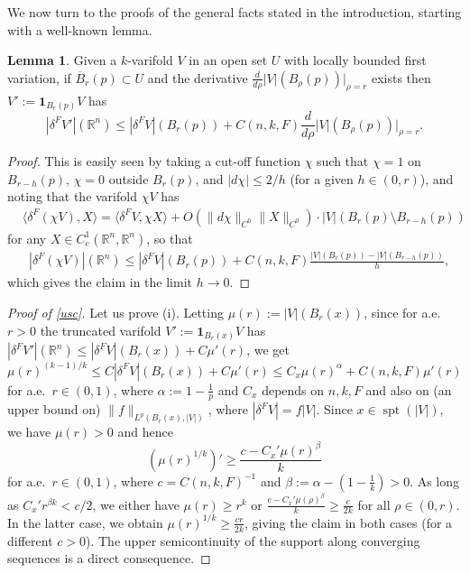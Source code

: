 \documentclass[11pt,a4paper]{amsart}
\newcommand{\R}{\mathbb{R}}
\newcommand{\ang}[1]{\langle#1\rangle}
\newcommand{\uno}{\bm{1}}
\renewcommand{\bar}{\overline}
\theoremstyle{definition}
\newtheorem{lemmaen}[definition]{Lemma}
\begin{document}
We now turn to the proofs of the general facts stated in the introduction, starting with a well-known lemma.

\begin{lemmaen}\label{trunc}
    Given a $k$-varifold $V$ in an open set $U$ with locally bounded first variation,
    if $\bar B_r(p)\subset U$ and the derivative $\frac{d}{d\rho}|V|(B_\rho(p))|_{\rho=r}$ exists then $V':=\uno_{B_r(p)}V$ has
    $$|\delta^F V'|(\R^n)\le |\delta^F V|(B_r(p))+C(n,k,F)\frac{d}{d\rho}|V|(B_\rho(p))\Big|_{\rho=r}.$$
\end{lemmaen}

\begin{proof}
    This is easily seen by taking a cut-off function $\chi$ such that $\chi=1$ on $B_{r-h}(p)$, $\chi=0$ outside $B_{r}(p)$, and $|d\chi|\le{2}/{h}$ (for a given $h\in(0,r)$), and noting that the varifold $\chi V$ has
	\begin{align*}
		&\ang{\delta^F(\chi V),X}=\ang{\delta^F V,\chi X}+O(\|d\chi\|_{C^0}\|X\|_{C^0})\cdot |V|(B_{r}(p)\setminus B_{r-h}(p))
	\end{align*}
	for any $X\in C^1_c(\R^n,\R^n)$, so that
	\begin{align*}
		&|\delta^F(\chi V)|(\R^n)\le |\delta^FV|(B_r(p))+C(n,k,F)\frac{|V|(B_{r}(p))-|V|(B_{r-h}(p))}{h},
	\end{align*}
    which gives the claim in the limit $h\to 0$.
\end{proof}

\begin{proof}[Proof of \cref{usc}]
    Let us prove (i). Letting $\mu(r):=|V|(B_r(x))$, since for a.e.\ $r>0$ the truncated varifold
$V':=\uno_{B_r(x)}V$ has $|\delta^FV'|(\R^n)\le|\delta^F V|(B_r(x))+C\mu'(r)$, we get
$$\mu(r)^{(k-1)/k}\le C|\delta^FV|(B_r(x))+C\mu'(r)\le C_x\mu(r)^\alpha+C(n,k,F)\mu'(r)$$
for a.e.\ $r\in(0,1)$, where $\alpha:=1-\frac1p$ and $C_x$ depends on $n,k,F$ and also on (an upper bound on) $\|f\|_{L^p(B_r(x),|V|)}$, where $|\delta^FV|=f|V|$.
Since $x\in\operatorname{spt}(|V|)$, we have $\mu(r)>0$ and hence
$$(\mu(r)^{1/k})'\ge \frac{c-C_x'\mu(r)^\beta}{k}$$
for a.e.\ $r\in(0,1)$,
where $c=C(n,k,F)^{-1}$ and $\beta:=\alpha-(1-\frac1k)>0$. As long as $C_x'r^{\beta k}<c/2$, we either have
$\mu(r)\ge r^k$ or $\frac{c-C_x'\mu(\rho)^\beta}{k}\ge\frac{c}{2k}$ for all $\rho\in(0,r)$. In the latter case, we obtain $\mu(r)^{1/k}\ge\frac{cr}{2k}$, giving the claim in both cases (for a different $c>0$).
The upper semicontinuity of the support along converging sequences is a direct consequence.
\end{proof}
\end{document}
